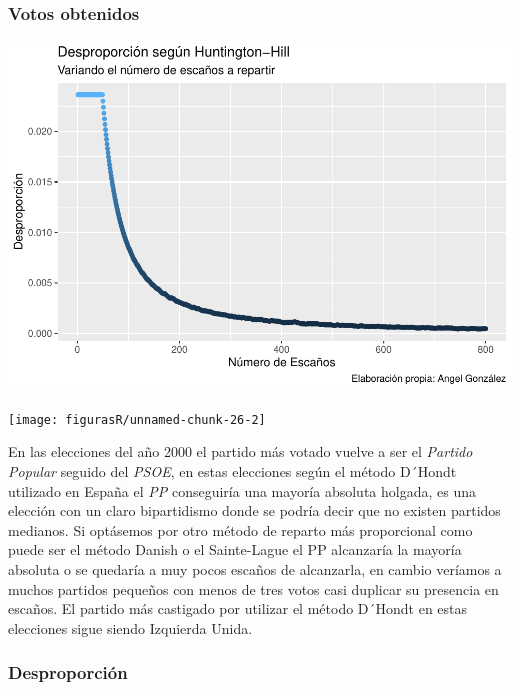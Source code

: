 \documentclass[12pt,a4paper,]{book}
\numberwithin{dummy}{section}
\theoremstyle{ocrenumbox}
\theoremstyle{blacknumex}
\theoremstyle{blacknumbox}
\theoremstyle{ocrenum}
\theoremstyle{ocrenum}
\begin{document}
\hypertarget{votos-obtenidos-7}{%
\subsubsection{Votos obtenidos}\label{votos-obtenidos-7}}

\begin{center}\includegraphics[width=1\linewidth]{figurasR/unnamed-chunk-26-1} \end{center}

\begin{center}\texttt{[image: figurasR/unnamed-chunk-26-2]} \end{center}

En las elecciones del año 2000 el partido más votado vuelve a ser el
\emph{Partido Popular} seguido del \emph{PSOE}, en estas elecciones
según el método D´Hondt utilizado en España el \emph{PP} conseguiría una
mayoría absoluta holgada, es una elección con un claro bipartidismo
donde se podría decir que no existen partidos medianos. Si optásemos por
otro método de reparto más proporcional como puede ser el método Danish
o el Sainte-Lague el PP alcanzaría la mayoría absoluta o se quedaría a
muy pocos escaños de alcanzarla, en cambio veríamos a muchos partidos
pequeños con menos de tres votos casi duplicar su presencia en escaños.
El partido más castigado por utilizar el método D´Hondt en estas
elecciones sigue siendo Izquierda Unida.

\hypertarget{desproporciuxf3n-7}{%
\subsubsection{Desproporción}\label{desproporciuxf3n-7}}
\end{document}
